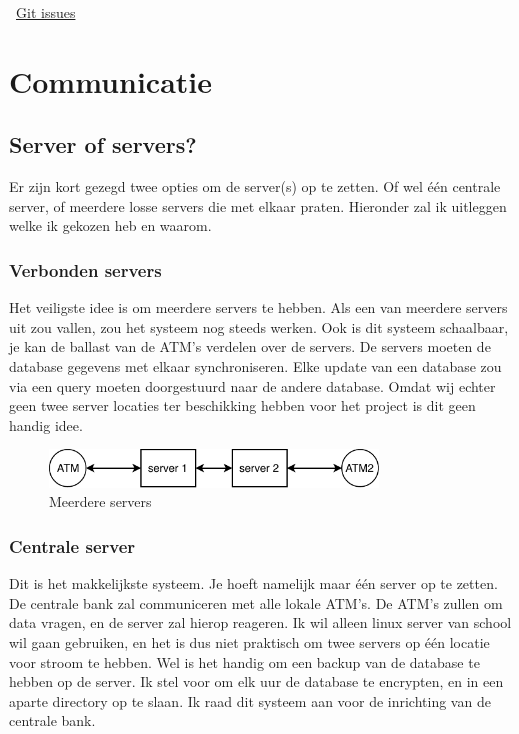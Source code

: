 \documentclass{article}
\begin{document}
\vspace{1mm}

\Mundus~\href{https://github.com/Gewad/Project4Bankalicious/issues}{Git issues}

\newpage

\section{Communicatie}

\subsection{Server of servers?} 

Er zijn kort gezegd twee opties om de server(s) op te zetten.
Of wel \'e\'en centrale server, of meerdere losse servers die met elkaar praten.
Hieronder zal ik uitleggen welke ik gekozen heb en waarom.

\subsubsection{Verbonden servers}

Het veiligste idee is om meerdere servers te hebben.
Als een van meerdere servers uit zou vallen, zou het systeem nog steeds werken.
Ook is dit systeem schaalbaar, je kan de ballast van de ATM's verdelen over de servers.
De servers moeten de database gegevens met elkaar synchroniseren.
Elke update van een database zou via een query moeten doorgestuurd naar de andere database.
Omdat wij echter geen twee server locaties ter beschikking hebben voor het project is dit geen handig idee.

\begin{figure}[!h]
        \centering
        \includegraphics[height=0.4in]{meerdere_servers.pdf}
        \caption{Meerdere servers}
        \label{fig: meerdere servers}
\end{figure}

\subsubsection{Centrale server}

Dit is het makkelijkste systeem.
Je hoeft namelijk maar \'e\'en server op te zetten.
De centrale bank zal communiceren met alle lokale ATM's.
De ATM's zullen om data vragen, en de server zal hierop reageren.
Ik wil alleen linux server van school wil gaan gebruiken, en het is dus niet praktisch om twee servers op \'e\'en locatie voor stroom te hebben.
Wel is het handig om een backup van de database te hebben op de server.
Ik stel voor om elk uur de database te encrypten, en in een aparte directory op te slaan.
Ik raad dit systeem aan voor de inrichting van de centrale bank.
\end{document}
